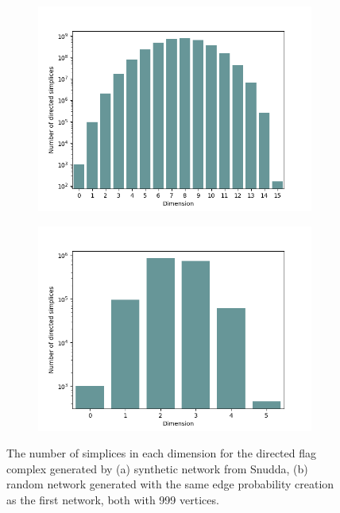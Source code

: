 \begin{figure}[ht]
  \centering
  \begin{subfigure}{.49 \linewidth}
    \includegraphics[scale=0.49]{./counts/real1k_count.png}
  \end{subfigure}%
  \begin{subfigure}{.49 \linewidth}
    \includegraphics[scale=0.49]{./counts/random1k_count.png}
  \end{subfigure}%
  \caption{\label{count1k}The number of simplices in each dimension for the directed flag complex generated by (a) synthetic network from Snudda, (b) random network generated with the same edge probability creation as the first network, both with 999 vertices.}
\end{figure}

